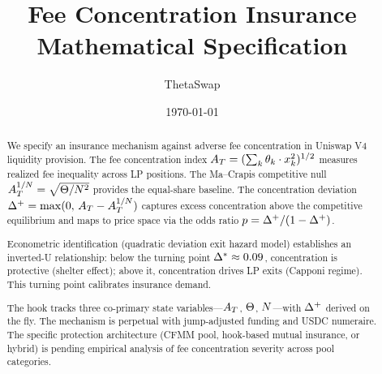 \documentclass[11pt,a4paper]{article}
\title{Fee Concentration Insurance\\[4pt]
       \large Mathematical Specification}
\author{ThetaSwap}
\date{\today}
\begin{document}
\maketitle

\begin{abstract}
We specify an insurance mechanism against adverse fee concentration in
Uniswap V4 liquidity provision. The fee concentration index
$A_T = (\sum_k \theta_k \cdot x_k^2)^{1/2}$ measures realized fee
inequality across LP positions. The Ma--Crapis competitive null
$A_T^{1/N} = \sqrt{\Theta/N^2}$ provides the equal-share baseline.
The concentration deviation $\Delta^{+} = \max(0,\, A_T - A_T^{1/N})$
captures excess concentration above the competitive equilibrium and maps to
price space via the odds ratio $p = \Delta^{+}/(1-\Delta^{+})$.

Econometric identification (quadratic deviation exit hazard model) establishes
an inverted-U relationship: below the turning point $\Delta^{*} \approx 0.09$,
concentration is protective (shelter effect); above it, concentration drives
LP exits (Capponi regime). This turning point calibrates insurance demand.

The hook tracks three co-primary state variables---$A_T$, $\Theta$, $N$---with
$\Delta^{+}$ derived on the fly. The mechanism is perpetual with jump-adjusted
funding and USDC numeraire. The specific protection architecture (CFMM pool,
hook-based mutual insurance, or hybrid) is pending empirical analysis of
fee concentration severity across pool categories.
\end{abstract}

\tableofcontents







\end{document}
